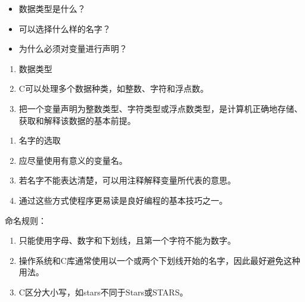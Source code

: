 \begin{frame}[fragile]
\begin{wenti}
\begin{itemize}
\item 数据类型是什么？
\item 可以选择什么样的名字？
\item 为什么必须对变量进行声明？
\end{itemize}
\end{wenti}
\end{frame}

\begin{frame}[fragile]
\begin{enumerate}[1]
\item 数据类型\\[0.1in]
\item[] C可以处理多个数据种类，如整数、字符和浮点数。\\[0.1in]
\item[] 把一个变量声明为整数类型、字符类型或浮点数类型，是计算机正确地存储、获取和解释该数据的基本前提。
\end{enumerate}
\end{frame}

\begin{frame}[fragile]
\begin{enumerate}[2]
\item 名字的选取\\[0.1in]
\item[] 应尽量使用有意义的变量名。\\[0.1in]
\item[] 若名字不能表达清楚，可以用注释解释变量所代表的意思。\\[0.1in]
\item[] 通过这些方式使程序更易读是良好编程的基本技巧之一。
\end{enumerate}
\end{frame}


\begin{frame}[fragile]
\textcolor{acolor3}{命名规则：} \vspace{0.1in}
\begin{enumerate}
\item 只能使用字母、数字和下划线，且第一个字符不能为数字。 \\[0.1in]
\item 操作系统和C库通常使用以一个或两个下划线开始的名字，因此最好避免这种用法。 \\[0.1in]
\item C区分大小写，如stars不同于Stars或STARS。

\end{enumerate}

\end{frame}


